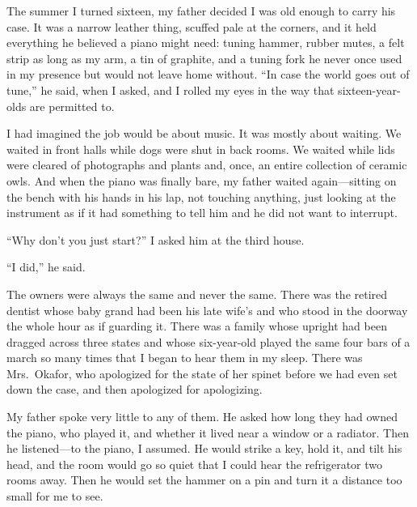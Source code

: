 \documentclass[11pt]{article}
\begin{document}
\clearpage
{}
\begin{passage}
The summer I turned sixteen, my father decided I was old enough to carry his case. It was a narrow leather thing, scuffed pale at the corners, and it held everything he believed a piano might need: tuning hammer, rubber mutes, a felt strip as long as my arm, a tin of graphite, and a tuning fork he never once used in my presence but would not leave home without. ``In case the world goes out of tune,'' he said, when I asked, and I rolled my eyes in the way that sixteen-year-olds are permitted to.

I had imagined the job would be about music. It was mostly about waiting. We waited in front halls while dogs were shut in back rooms. We waited while lids were cleared of photographs and plants and, once, an entire collection of ceramic owls. And when the piano was finally bare, my father waited again---sitting on the bench with his hands in his lap, not touching anything, just looking at the instrument as if it had something to tell him and he did not want to interrupt.

``Why don't you just start?'' I asked him at the third house.

``I did,'' he said.

The owners were always the same and never the same. There was the retired dentist whose baby grand had been his late wife's and who stood in the doorway the whole hour as if guarding it. There was a family whose upright had been dragged across three states and whose six-year-old played the same four bars of a march so many times that I began to hear them in my sleep. There was Mrs.~Okafor, who apologized for the state of her spinet before we had even set down the case, and then apologized for apologizing.

My father spoke very little to any of them. He asked how long they had owned the piano, who played it, and whether it lived near a window or a radiator. Then he listened---to the piano, I assumed. He would strike a key, hold it, and tilt his head, and the room would go so quiet that I could hear the refrigerator two rooms away. Then he would set the hammer on a pin and turn it a distance too small for me to see.


\end{passage}
\end{document}
